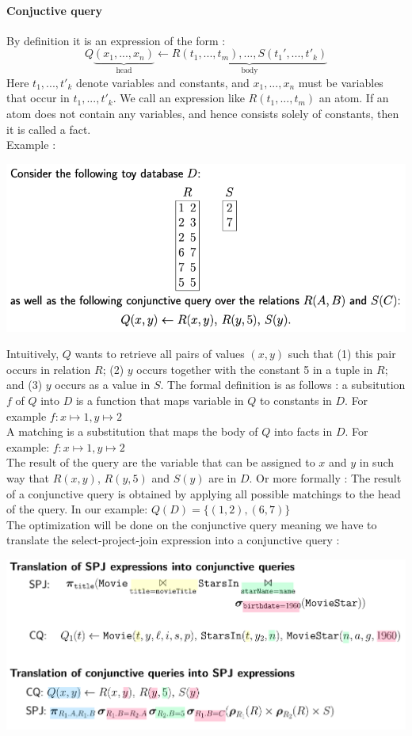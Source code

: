 \documentclass[12pt,a4paper]{article}
\begin{document}
\paragraph{Conjuctive query}
By definition it is an expression of the form : 
$$Q\underbrace{(x_1,...,x_n)}_{\text{head}}\leftarrow \underbrace{R(t_1,...,t_m),...,S(t_1',...,t'_k)}_{\text{body}}$$
Here $t_1, . . . , t'_k$ denote variables and constants, and $x_1, . . . , x_n$ must be variables that occur in $t_1,...,t'_k$. We call an expression like $R(t_1,...,t_m)$ an atom. If an atom does not contain any variables, and hence consists solely of constants, then it is called a fact.\\

Example : 
\begin{center}
\includegraphics[scale=0.4]{img/img20.png}
\end{center}
Intuitively, $Q$ wants to retrieve all pairs of values $(x,y)$ such that (1) this pair occurs in relation $R$; (2) $y$ occurs together with the constant 5 in a tuple in $R$; and (3) $y$ occurs as a value in $S$. The formal definition is as follows : a subsitution $f$ of $Q$ into $D$ is a function that maps variable in $Q$ to constants in $D$. For example $f : x \mapsto 1, y \mapsto 2$\\
A matching is a substitution that maps the body of $Q$ into facts in $D$. For example: $f : x \mapsto 1, y \mapsto 2$\\
The result of the query are the variable that can be assigned to $x$ and $y$ in such way that $R(x,y)$, $R(y,5)$ and $S(y)$ are in $D$. Or more formally : The result of a conjunctive query is obtained by applying all possible matchings to the head of the query. In our example: $Q(D) = \lbrace(1,2),(6,7)\rbrace$\\
The optimization will be done on the conjunctive query meaning we have to translate the select-project-join expression into a conjunctive query :
\begin{center}
\includegraphics[scale=0.3]{img/img21.png}
\end{center}
\end{document}
